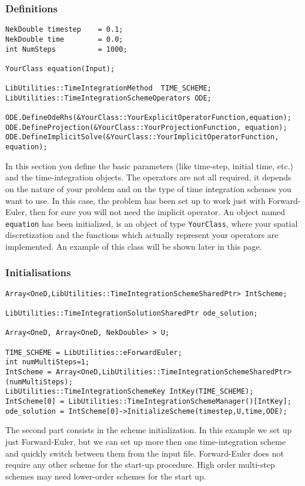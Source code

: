 \subsubsection{Definitions} 
\begin{lstlisting}[style=C++Style]
NekDouble timestep    = 0.1; 
NekDouble time        = 0.0;
int NumSteps          = 1000;

YourClass equation(Input);
    
LibUtilities::TimeIntegrationMethod  TIME_SCHEME;
LibUtilities::TimeIntegrationSchemeOperators ODE;

ODE.DefineOdeRhs(&YourClass::YourExplicitOperatorFunction,equation);
ODE.DefineProjection(&YourClass::YourProjectionFunction, equation);
ODE.DefineImplicitSolve(&YourClass::YourImplicitOperatorFunction, equation);
\end{lstlisting}
In this section you define the basic parameters (like time-step, initial time,
etc.) and the time-integration objects.
The operators are not all required, it depends on the nature of your problem and
on the type of time integration schemes you want to use. In this case, the
problem has been set up to work just with Forward-Euler, then for sure you will
not need the implicit operator.
An object named \texttt{equation} has been initialized, is an object of type
\texttt{YourClass}, where your spatial discretization and the functions which
actually represent your operators are implemented. An example of this class will
be shown later in this page.

\subsubsection{Initialisations}
\begin{lstlisting}[style=C++Style]
Array<OneD,LibUtilities::TimeIntegrationSchemeSharedPtr> IntScheme;
    
LibUtilities::TimeIntegrationSolutionSharedPtr ode_solution;
    
Array<OneD, Array<OneD, NekDouble> > U;

TIME_SCHEME = LibUtilities::eForwardEuler; 
int numMultiSteps=1; 
IntScheme = Array<OneD,LibUtilities::TimeIntegrationSchemeSharedPtr>(numMultiSteps); 
LibUtilities::TimeIntegrationSchemeKey IntKey(TIME_SCHEME); 
IntScheme[0] = LibUtilities::TimeIntegrationSchemeManager()[IntKey];
ode_solution = IntScheme[0]->InitializeScheme(timestep,U,time,ODE);
\end{lstlisting}
The second part consists in the scheme initialization. In this example we set up
just Forward-Euler, but we can set up more then one time-integration scheme and
quickly switch between them from the input file.
Forward-Euler does not require any other scheme for the start-up procedure. High
order multi-step schemes may need lower-order schemes for the start up.

